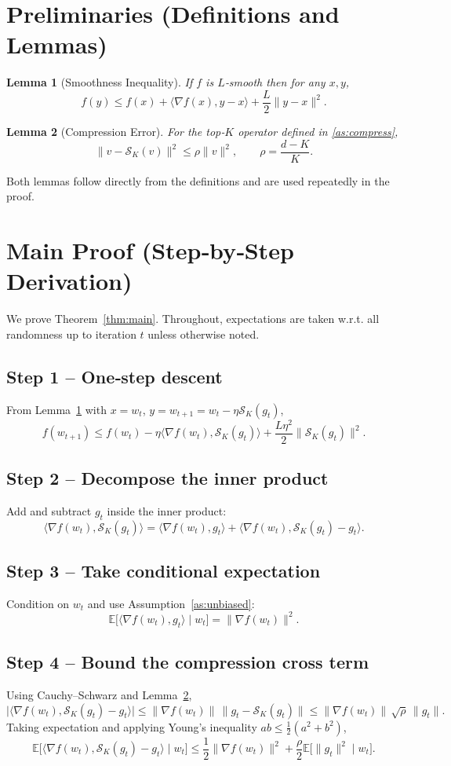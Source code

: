 \documentclass{article}
\newtheorem{lemma}{Lemma}
\newcommand{\topk}[1]{\mathcal{S}_K(#1)}
\begin{document}
\newpage

\section*{Preliminaries (Definitions and Lemmas)}
\begin{lemma}[Smoothness Inequality]\label{lem:smooth}
If $f$ is $L$‑smooth then for any $x,y$,
\[
f(y)\le f(x)+\langle\nabla f(x),y-x\rangle+\frac{L}{2}\|y-x\|^2 .
\]
\end{lemma}
\begin{lemma}[Compression Error]\label{lem:compress}
For the top‑$K$ operator defined in \eqref{as:compress},
\[
\|v-\topk{v}\|^2\le\rho\|v\|^2,\qquad\rho=\frac{d-K}{K}.
\]
\end{lemma}
Both lemmas follow directly from the definitions and are used repeatedly in the proof.

\section*{Main Proof (Step‑by‑Step Derivation)}
We prove Theorem~\ref{thm:main}. Throughout, expectations are taken w.r.t. all randomness up to iteration $t$ unless otherwise noted.

\subsection*{Step 1 – One‑step descent}
From Lemma~\ref{lem:smooth} with $x=w_t$, $y=w_{t+1}=w_t-\eta\topk{g_t}$,
\[
f(w_{t+1})\le f(w_t)-\eta\langle\nabla f(w_t),\topk{g_t}\rangle
+\frac{L\eta^{2}}{2}\|\topk{g_t}\|^{2}. \tag{4}
\]

\subsection*{Step 2 – Decompose the inner product}
Add and subtract $g_t$ inside the inner product:
\[
\langle\nabla f(w_t),\topk{g_t}\rangle
=\langle\nabla f(w_t),g_t\rangle
+\langle\nabla f(w_t),\topk{g_t}-g_t\rangle . \tag{5}
\]

\subsection*{Step 3 – Take conditional expectation}
Condition on $w_t$ and use Assumption~\ref{as:unbiased}:
\[
\mathbb{E}\big[\langle\nabla f(w_t),g_t\rangle\mid w_t\big]
=\|\nabla f(w_t)\|^{2}. \tag{6}
\]

\subsection*{Step 4 – Bound the compression cross term}
Using Cauchy–Schwarz and Lemma~\ref{lem:compress},
\[
\big|\langle\nabla f(w_t),\topk{g_t}-g_t\rangle\big|
\le\|\nabla f(w_t)\|\,\|g_t-\topk{g_t}\|
\le\|\nabla f(w_t)\|\,\sqrt{\rho}\,\|g_t\| . \tag{7}
\]
Taking expectation and applying Young’s inequality $ab\le\frac{1}{2}(a^{2}+b^{2})$,
\[
\mathbb{E}\big[\langle\nabla f(w_t),\topk{g_t}-g_t\rangle\mid w_t\big]
\le\frac{1}{2}\|\nabla f(w_t)\|^{2}
+\frac{\rho}{2}\mathbb{E}\big[\|g_t\|^{2}\mid w_t\big]. \tag{8}
\]
\end{document}
